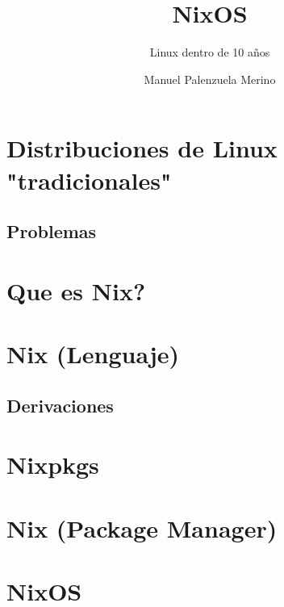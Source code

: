 \documentclass[aspectratio=43]{beamer}
\title{NixOS} %
\subtitle{Linux dentro de 10 años} %
\author{Manuel Palenzuela Merino} %
\institute{\edicion \ Jornadas Técnicas del GUL}
\date{\fecha}
\begin{document}
{
    \begin{frame}
        \titlepage
    \end{frame}
}
\addtocounter{framenumber}{-1}


\section{Distribuciones de Linux "tradicionales"}
\subsection{Problemas}
\section{Que es Nix?}
\section{Nix (Lenguaje)}
\subsection{Derivaciones}
\section{Nixpkgs}
\section{Nix (Package Manager)}
\section{NixOS}
\end{document}
